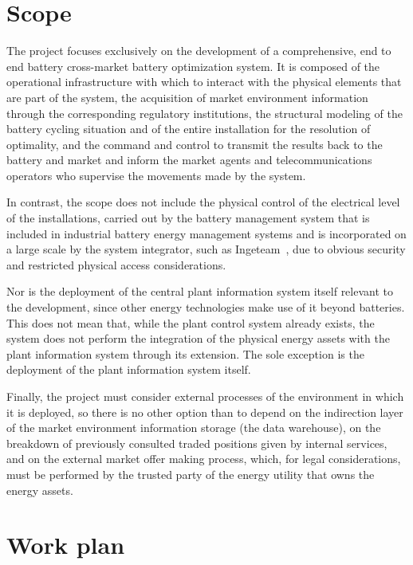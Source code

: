 \section*{Scope}%
\label{makereference9.2}

The project focuses exclusively on the development of a comprehensive, end to end battery cross-market battery optimization system. It is composed of the operational infrastructure with which to interact with the physical elements that are part of the system, the acquisition of market environment information through the corresponding regulatory institutions, the structural modeling of the battery cycling situation and of the entire installation for the resolution of optimality, and the command and control to transmit the results back to the battery and market and inform the market agents and telecommunications operators who supervise the movements made by the system.

In contrast, the scope does not include the physical control of the electrical level of the installations, carried out by the battery management system that is included in industrial battery energy management systems and is incorporated on a large scale by the system integrator, such as Ingeteam~\cite{ingeteam2022ingeteam}, due to obvious security and restricted physical access considerations.

Nor is the deployment of the central plant information system itself relevant to the development, since other energy technologies make use of it beyond batteries. This does not mean that, while the plant control system already exists, the system does not perform the integration of the physical energy assets with the plant information system through its extension. The sole exception is the deployment of the plant information system itself.

Finally, the project must consider external processes of the environment in which it is deployed, so there is no other option than to depend on the indirection layer of the market environment information storage (the data warehouse), on the breakdown of previously consulted traded positions given by internal services, and on the external market offer making process, which, for legal considerations, must be performed by the trusted party of the energy utility that owns the energy assets.

\section*{Work plan}%
\label{makereference9.3}

